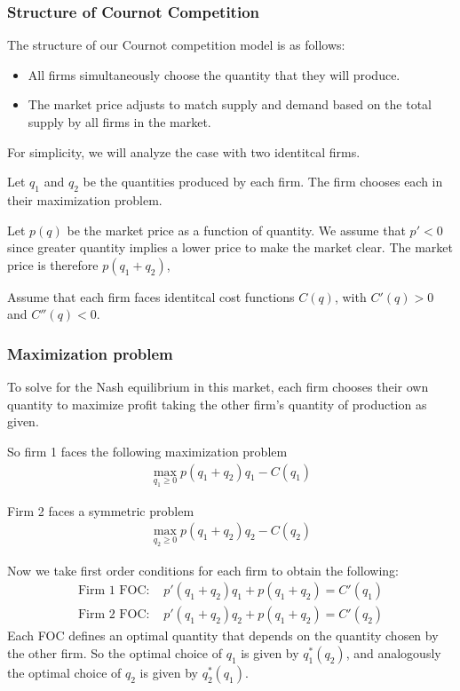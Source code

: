 \subsubsection*{Structure of Cournot Competition}
The structure of our Cournot competition model is as follows:
\begin{itemize}
    \item All firms simultaneously choose the quantity that they will produce.
    \item The market price adjusts to match supply and demand based on the total supply by all firms in the market. 
\end{itemize}

For simplicity, we will analyze the case with two identitcal firms.

Let $q_1$ and $q_2$ be the quantities produced by each firm. The firm chooses each in their maximization problem. 

Let $p(q)$ be the market price as a function of quantity. We assume that $p' < 0$ since greater quantity implies a lower price to make the market clear. The market price is therefore $p(q_1 + q_2)$, 

Assume that each firm faces identitcal cost functions $C(q)$, with $C'(q) > 0$ and $C''(q) < 0$. 

\subsubsection*{Maximization problem}
To solve for the Nash equilibrium in this market, each firm chooses their own quantity to maximize profit taking the other firm's quantity of production as given.

So firm 1 faces the following maximization problem
\begin{align*}
    \max_{q_1 \geq 0} p(q_1 + q_2)q_1 - C(q_1)
\end{align*}

Firm 2 faces a symmetric problem
\begin{align*}
    \max_{q_2 \geq 0} p(q_1 + q_2)q_2 - C(q_2)
\end{align*}

Now we take first order conditions for each firm to obtain the following: 
\begin{align*}
    \text{Firm 1 FOC: } &p'(q_1 + q_2)q_1 + p(q_1 + q_2) = C'(q_1) \\ 
    \text{Firm 2 FOC: } &p'(q_1 + q_2)q_2 + p(q_1 + q_2) = C'(q_2)
\end{align*}
Each FOC defines an optimal quantity that depends on the quantity chosen by the other firm. So the optimal choice of $q_1$ is given by $q_1^*(q_2)$, and analogously the optimal choice of $q_2$ is given by $q_2^*(q_1)$.

